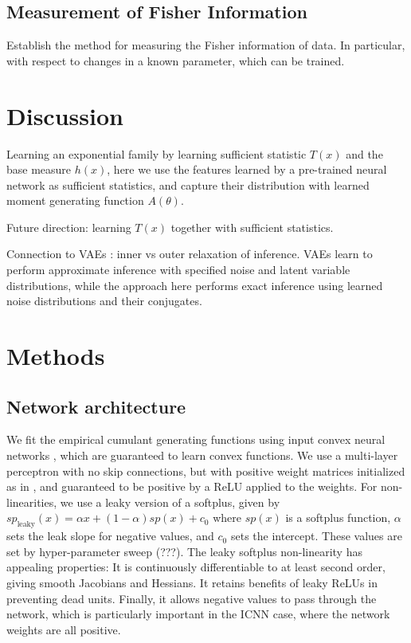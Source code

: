 \documentclass[10pt]{article}      %
\begin{document}
\subsection{Measurement of Fisher Information}

Establish the method for measuring the Fisher information of data. In particular, with respect to changes in a known parameter, which can be trained.




\section{Discussion}

Learning an exponential family by learning sufficient statistic $T(x)$ and the base measure $h(x)$, here we use the features learned by a pre-trained neural network as sufficient statistics, and capture their distribution with learned moment generating function $A(\theta)$.

Future direction: learning $T(x)$ together with sufficient statistics.

Connection to VAEs \cite{kingma_auto-encoding_2013}: inner vs outer relaxation of inference.
VAEs learn to perform approximate inference with specified noise and latent variable distributions, while the approach here performs exact inference using learned noise distributions and their conjugates. 


\section{Methods}
\subsection{Network architecture}

We fit the empirical cumulant generating functions using input convex neural networks \cite{amos_input_2017}, which are guaranteed to learn convex functions.
We use a multi-layer perceptron with no skip connections, but with positive weight matrices initialized as in \cite{hoedt_principled_2023}, and guaranteed to be positive by a ReLU applied to the weights.
For non-linearities, we use a leaky version of a softplus, given by $sp_{\textrm{leaky}}(x) = \alpha x + (1 - \alpha) sp(x) + c_0$ where $sp(x)$ is a softplus function, $\alpha$ sets the leak slope for negative values, and $c_0$ sets the intercept. 
These values are set by hyper-parameter sweep (???). 
The leaky softplus non-linearity has appealing properties:
It is continuously differentiable to at least second order, giving smooth Jacobians and Hessians.
It retains benefits of leaky ReLUs in preventing dead units.
Finally, it allows negative values to pass through the network, which is particularly important in the ICNN case, where the network weights are all positive.
\end{document}
